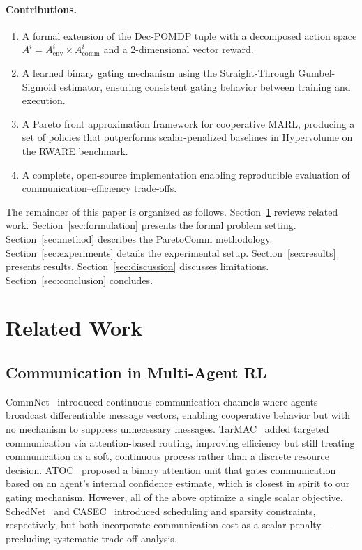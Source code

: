\documentclass[runningheads]{llncs}
\begin{document}
\paragraph{Contributions.}
\begin{enumerate}
  \item A formal extension of the Dec-POMDP tuple with a decomposed
    action space $A^i = A^i_\text{env} \times A^i_\text{comm}$ and
    a 2-dimensional vector reward.
  \item A learned binary gating mechanism using the Straight-Through
    Gumbel-Sigmoid estimator, ensuring consistent gating behavior
    between training and execution.
  \item A Pareto front approximation framework for cooperative MARL,
    producing a set of policies that outperforms scalar-penalized
    baselines in Hypervolume on the RWARE benchmark.
  \item A complete, open-source implementation enabling reproducible
    evaluation of communication--efficiency trade-offs.
\end{enumerate}

The remainder of this paper is organized as follows.
Section~\ref{sec:related} reviews related work.
Section~\ref{sec:formulation} presents the formal problem setting.
Section~\ref{sec:method} describes the ParetoComm methodology.
Section~\ref{sec:experiments} details the experimental setup.
Section~\ref{sec:results} presents results.
Section~\ref{sec:discussion} discusses limitations.
Section~\ref{sec:conclusion} concludes.

\section{Related Work}
\label{sec:related}

\subsection{Communication in Multi-Agent RL}

CommNet~\cite{sukhbaatar2016learning} introduced continuous
communication channels where agents broadcast differentiable message
vectors, enabling cooperative behavior but with no mechanism to
suppress unnecessary messages.
TarMAC~\cite{das2019tarmac} added targeted communication via
attention-based routing, improving efficiency but still treating
communication as a soft, continuous process rather than a discrete
resource decision.
ATOC~\cite{jiang2018learning} proposed a binary attention unit that
gates communication based on an agent's internal confidence estimate,
which is closest in spirit to our gating mechanism.
However, all of the above optimize a single scalar objective.
SchedNet~\cite{kim2019schednet} and CASEC~\cite{wang2020learning}
introduced scheduling and sparsity constraints, respectively, but both
incorporate communication cost as a scalar penalty---precluding
systematic trade-off analysis.
\end{document}
